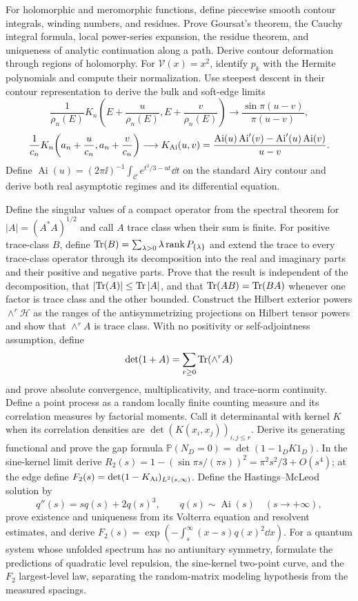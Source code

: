 \begin{exercise}
For holomorphic and meromorphic functions, define piecewise smooth contour
integrals, winding numbers, and residues.  Prove Goursat's theorem, the Cauchy
integral formula, local power-series expansion, the residue theorem, and
uniqueness of analytic continuation along a path.  Derive contour deformation
through regions of holomorphy.
For $\mathcal V(x)=x^2$, identify $p_k$ with the Hermite polynomials and
compute their normalization.  Use steepest descent in
their contour representation to derive the bulk and soft-edge limits
\[
 \frac1{\rho_n(E)}K_n\!\left(E+\frac u{\rho_n(E)},
 E+\frac v{\rho_n(E)}\right)\longrightarrow
 \frac{\sin\pi(u-v)}{\pi(u-v)},
\]
\[
 \frac1{c_n}K_n\!\left(a_n+\frac u{c_n},a_n+\frac v{c_n}\right)
 \longrightarrow K_{\rm Ai}(u,v)
 =\frac{\operatorname{Ai}(u)\operatorname{Ai}'(v)
 -\operatorname{Ai}'(u)\operatorname{Ai}(v)}{u-v}.
\]
Define
$\operatorname{Ai}(u)=(2\pi\ii)^{-1}\int_{\mathcal C}
e^{t^3/3-ut}\dd t$ on the standard Airy contour and derive both
real asymptotic regimes and its differential equation.
\end{exercise}

\begin{exercise}
Define the singular values of a compact operator from the spectral theorem
for $|A|=(A^*A)^{1/2}$ and call $A$ trace class when their sum is finite.
For positive trace-class $B$, define
$\operatorname{Tr}(B)=\sum_{\lambda>0}\lambda\operatorname{rank}P_{\{\lambda\}}$ and extend
the trace to every trace-class operator through its decomposition into the
real and imaginary parts and their positive and negative parts.  Prove that
the result is independent of the decomposition, that
$\left\lvert \operatorname{Tr}(A)\right\rvert\leq\operatorname{Tr}\left\lvert A\right\rvert$, and that $\operatorname{Tr}(AB)=\operatorname{Tr}(BA)$ whenever one factor is
trace class and the other bounded.  Construct the Hilbert exterior powers
$\wedge^r\mathcal H$ as the ranges of the antisymmetrizing projections on
Hilbert tensor powers and show that $\wedge^rA$ is trace class.  With no
positivity or self-adjointness assumption, define
\[
 \det(1+A)=\sum_{r\ge0}\operatorname{Tr}(\wedge^rA)
\]
and prove absolute convergence, multiplicativity, and trace-norm continuity.
Define a point process as a random locally finite counting measure and its
correlation measures by factorial moments.  Call it determinantal with kernel
$K$ when its correlation densities are
$\det(K(x_i,x_j))_{i,j\le r}$.  Derive its generating functional and prove
the gap formula
$\mathbb P(N_D=0)=\det(1-1_DK1_D)$.  In the sine-kernel limit derive
$R_2(s)=1-(\sin\pi s/(\pi s))^2=\pi^2s^2/3+O(s^4)$; at the edge define
$F_2(s)=\det(1-K_{\rm Ai})_{L^2(s,\infty)}$.  Define the Hastings--McLeod
solution by
\[
 q''(s)=sq(s)+2q(s)^3,\qquad q(s)\sim\operatorname{Ai}(s)
 \quad(s\to+\infty),
\]
prove existence and uniqueness from its Volterra equation and resolvent
estimates, and derive
$F_2(s)=\exp(-\int_s^\infty(x-s)q(x)^2\dd x)$.  For a quantum system whose
unfolded spectrum has no
antiunitary symmetry, formulate the predictions of quadratic level repulsion,
the sine-kernel two-point curve, and the $F_2$ largest-level law, separating
the random-matrix modeling hypothesis from the measured spacings.
\end{exercise}
